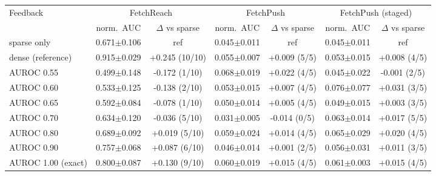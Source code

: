 \begin{tabular}{lcccccc}
\toprule
Feedback & \multicolumn{2}{c}{FetchReach} & \multicolumn{2}{c}{FetchPush} & \multicolumn{2}{c}{FetchPush (staged)} \\
 & norm.\ AUC & $\Delta$ vs sparse & norm.\ AUC & $\Delta$ vs sparse & norm.\ AUC & $\Delta$ vs sparse \\
\midrule
sparse only & 0.671\scriptsize{$\pm$0.106} & ref & 0.045\scriptsize{$\pm$0.011} & ref & 0.045\scriptsize{$\pm$0.011} & ref \\
dense (reference) & 0.915\scriptsize{$\pm$0.029} & +0.245 (10/10) & 0.055\scriptsize{$\pm$0.007} & +0.009 (5/5) & 0.053\scriptsize{$\pm$0.015} & +0.008 (4/5) \\
AUROC 0.55 & 0.499\scriptsize{$\pm$0.148} & -0.172 (1/10) & 0.068\scriptsize{$\pm$0.019} & +0.022 (4/5) & 0.045\scriptsize{$\pm$0.022} & -0.001 (2/5) \\
AUROC 0.60 & 0.533\scriptsize{$\pm$0.125} & -0.138 (2/10) & 0.053\scriptsize{$\pm$0.015} & +0.007 (4/5) & 0.076\scriptsize{$\pm$0.077} & +0.031 (3/5) \\
AUROC 0.65 & 0.592\scriptsize{$\pm$0.084} & -0.078 (1/10) & 0.050\scriptsize{$\pm$0.014} & +0.005 (4/5) & 0.049\scriptsize{$\pm$0.015} & +0.003 (3/5) \\
AUROC 0.70 & 0.634\scriptsize{$\pm$0.120} & -0.036 (5/10) & 0.031\scriptsize{$\pm$0.005} & -0.014 (0/5) & 0.063\scriptsize{$\pm$0.014} & +0.017 (5/5) \\
AUROC 0.80 & 0.689\scriptsize{$\pm$0.092} & +0.019 (5/10) & 0.059\scriptsize{$\pm$0.024} & +0.014 (4/5) & 0.065\scriptsize{$\pm$0.029} & +0.020 (4/5) \\
AUROC 0.90 & 0.757\scriptsize{$\pm$0.068} & +0.087 (6/10) & 0.046\scriptsize{$\pm$0.014} & +0.001 (2/5) & 0.056\scriptsize{$\pm$0.031} & +0.011 (3/5) \\
AUROC 1.00 (exact) & 0.800\scriptsize{$\pm$0.087} & +0.130 (9/10) & 0.060\scriptsize{$\pm$0.019} & +0.015 (4/5) & 0.061\scriptsize{$\pm$0.003} & +0.015 (4/5) \\
\bottomrule
\end{tabular}

